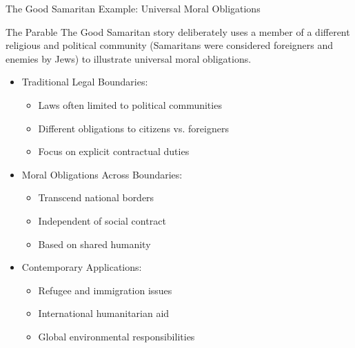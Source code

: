 \documentclass{beamer}
\begin{document}
\begin{frame}{The Good Samaritan Example: Universal Moral Obligations}
    \begin{alertblock}{The Parable}
        The Good Samaritan story deliberately uses a member of a different religious and political community (Samaritans were considered foreigners and enemies by Jews) to illustrate universal moral obligations.
    \end{alertblock}

    \begin{itemize}
        \item Traditional Legal Boundaries:
        \begin{itemize}
            \item Laws often limited to political communities
            \item Different obligations to citizens vs. foreigners
            \item Focus on explicit contractual duties
        \end{itemize}
        
        \item Moral Obligations Across Boundaries:
        \begin{itemize}
            \item Transcend national borders
            \item Independent of social contract
            \item Based on shared humanity
        \end{itemize}
        
        \item Contemporary Applications:
            \begin{itemize}
                \item Refugee and immigration issues
                \item International humanitarian aid
                \item Global environmental responsibilities
            \end{itemize}
    \end{itemize}
    
\end{frame}
\end{document}
